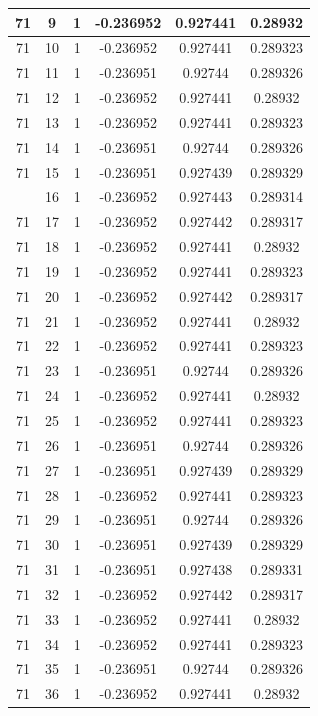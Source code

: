 \documentclass[12pt,a4paper]{article}
\numberwithin{equation}{section}
\numberwithin{figure}{section}
\numberwithin{table}{section}
\begin{document}
\begin{longtable}{|c|c|c|c|c|c|}
71 & 9 & 1 & -0.236952 & 0.927441 & 0.28932 \\ \hline
71 & 10 & 1 & -0.236952 & 0.927441 & 0.289323 \\ \hline
71 & 11 & 1 & -0.236951 & 0.92744 & 0.289326 \\ \hline
71 & 12 & 1 & -0.236952 & 0.927441 & 0.28932 \\ \hline
71 & 13 & 1 & -0.236952 & 0.927441 & 0.289323 \\ \hline
71 & 14 & 1 & -0.236951 & 0.92744 & 0.289326 \\ \hline
71 & 15 & 1 & -0.236951 & 0.927439 & 0.289329 \\ \hline
\pagebreak
71 & 16 & 1 & -0.236952 & 0.927443 & 0.289314 \\ \hline
71 & 17 & 1 & -0.236952 & 0.927442 & 0.289317 \\ \hline
71 & 18 & 1 & -0.236952 & 0.927441 & 0.28932 \\ \hline
71 & 19 & 1 & -0.236952 & 0.927441 & 0.289323 \\ \hline
71 & 20 & 1 & -0.236952 & 0.927442 & 0.289317 \\ \hline
71 & 21 & 1 & -0.236952 & 0.927441 & 0.28932 \\ \hline
71 & 22 & 1 & -0.236952 & 0.927441 & 0.289323 \\ \hline
71 & 23 & 1 & -0.236951 & 0.92744 & 0.289326 \\ \hline
71 & 24 & 1 & -0.236952 & 0.927441 & 0.28932 \\ \hline
71 & 25 & 1 & -0.236952 & 0.927441 & 0.289323 \\ \hline
71 & 26 & 1 & -0.236951 & 0.92744 & 0.289326 \\ \hline
71 & 27 & 1 & -0.236951 & 0.927439 & 0.289329 \\ \hline
71 & 28 & 1 & -0.236952 & 0.927441 & 0.289323 \\ \hline
71 & 29 & 1 & -0.236951 & 0.92744 & 0.289326 \\ \hline
71 & 30 & 1 & -0.236951 & 0.927439 & 0.289329 \\ \hline
71 & 31 & 1 & -0.236951 & 0.927438 & 0.289331 \\ \hline
71 & 32 & 1 & -0.236952 & 0.927442 & 0.289317 \\ \hline
71 & 33 & 1 & -0.236952 & 0.927441 & 0.28932 \\ \hline
71 & 34 & 1 & -0.236952 & 0.927441 & 0.289323 \\ \hline
71 & 35 & 1 & -0.236951 & 0.92744 & 0.289326 \\ \hline
71 & 36 & 1 & -0.236952 & 0.927441 & 0.28932 \\ \hline

\end{longtable}
\end{document}
